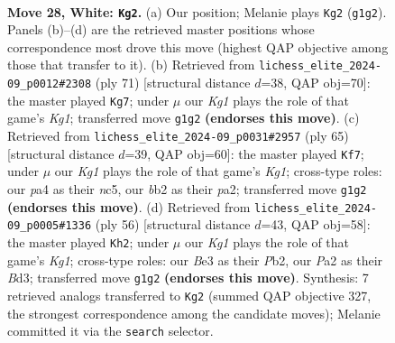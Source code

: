 \documentclass[11pt]{article}
\begin{document}
\clearpage

\begin{figure}[p]\centering
\begin{subfigure}{0.46\textwidth}\centering
\resizebox{\linewidth}{!}{%
\newchessgame
\chessboard[
  setfen={r7/2p2kpp/3p4/8/pP4Q1/4B1P1/Pb3P1P/1q4K1 w - - 1 28},
  showmover=false,
  pgfstyle=straightmove, color=movearrow, markmove={g1-g2}
]}
\caption{}
\end{subfigure}\hfill
\begin{subfigure}{0.46\textwidth}\centering
\resizebox{\linewidth}{!}{%
\newchessgame
\chessboard[
  setfen={1Q4k1/3b1p1p/6p1/1p1P4/p1q1B2P/6P1/1P3PK1/8 b - - 2 36},
  showmover=false,
  pgfstyle=straightmove, color=movearrow, markmove={g8-g7}
]}
\caption{}
\end{subfigure}
\\[4pt]
\begin{subfigure}{0.46\textwidth}\centering
\resizebox{\linewidth}{!}{%
\newchessgame
\chessboard[
  setfen={Q5k1/7p/2p5/2Np1b2/3q2pP/5pP1/PP3P1K/8 b - - 1 33},
  showmover=false,
  pgfstyle=straightmove, color=movearrow, markmove={g8-f7}
]}
\caption{}
\end{subfigure}\hfill
\begin{subfigure}{0.46\textwidth}\centering
\resizebox{\linewidth}{!}{%
\newchessgame
\chessboard[
  setfen={4b1k1/pp3pp1/4p2p/8/3Q4/P2BP2P/1P3PP1/2q3K1 w - - 1 29},
  showmover=false,
  pgfstyle=straightmove, color=movearrow, markmove={g1-h2}
]}
\caption{}
\end{subfigure}
\caption{\textbf{Move 28, White: \texttt{Kg2}.} (a) Our position; Melanie plays \texttt{Kg2} (\texttt{g1g2}). Panels (b)--(d) are the retrieved master positions whose correspondence most drove this move (highest QAP objective among those that transfer to it). (b) Retrieved from \texttt{lichess\_elite\_2024-09\_p0012\#2308} (ply 71) [structural distance $d$=38, QAP obj=70]: the master played \texttt{Kg7}; under $\mu$ our \emph{Kg1} plays the role of that game's \emph{Kg1}; transferred move \texttt{g1g2} \textbf{(endorses this move)}. (c) Retrieved from \texttt{lichess\_elite\_2024-09\_p0031\#2957} (ply 65) [structural distance $d$=39, QAP obj=60]: the master played \texttt{Kf7}; under $\mu$ our \emph{Kg1} plays the role of that game's \emph{Kg1}; cross-type roles: our \emph{p}a4 as their \emph{n}c5, our \emph{b}b2 as their \emph{p}a2; transferred move \texttt{g1g2} \textbf{(endorses this move)}. (d) Retrieved from \texttt{lichess\_elite\_2024-09\_p0005\#1336} (ply 56) [structural distance $d$=43, QAP obj=58]: the master played \texttt{Kh2}; under $\mu$ our \emph{Kg1} plays the role of that game's \emph{Kg1}; cross-type roles: our \emph{B}e3 as their \emph{P}b2, our \emph{P}a2 as their \emph{B}d3; transferred move \texttt{g1g2} \textbf{(endorses this move)}. Synthesis: 7 retrieved analogs transferred to \texttt{Kg2} (summed QAP objective 327, the strongest correspondence among the candidate moves); Melanie committed it via the \texttt{search} selector.}
\label{fig:thought-m54}
\end{figure}
\end{document}

